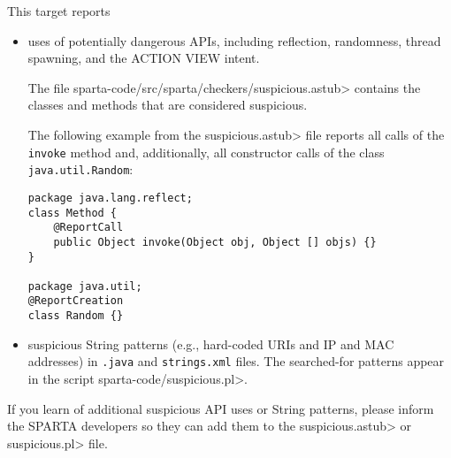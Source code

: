 This target reports
\begin{itemize}
\item
  uses of potentially dangerous APIs, including reflection, randomness,
  thread spawning, and the ACTION VIEW intent.

  The file \<sparta-code/src/sparta/checkers/suspicious.astub> contains the classes and methods that are considered suspicious.

The following example from the \<suspicious.astub> file reports all calls
of the \verb|invoke| method and, additionally, all constructor calls 
of the class \verb|java.util.Random|:

\begin{Verbatim}
package java.lang.reflect;                                             
class Method {                                                         
    @ReportCall                                                        
    public Object invoke(Object obj, Object [] objs) {}                
}                                                                      
                                                                       
package java.util;                                                     
@ReportCreation                                                        
class Random {}
\end{Verbatim}

\item
  suspicious String patterns (e.g., hard-coded URIs and IP and MAC addresses) 
  in \verb|.java| and \verb|strings.xml| files.  The searched-for patterns
  appear in the script \<sparta-code/suspicious.pl>.


\end{itemize}

If you learn of additional suspicious API uses or String patterns, please
inform the SPARTA developers so they can add them to the
\<suspicious.astub> or \<suspicious.pl> file.


